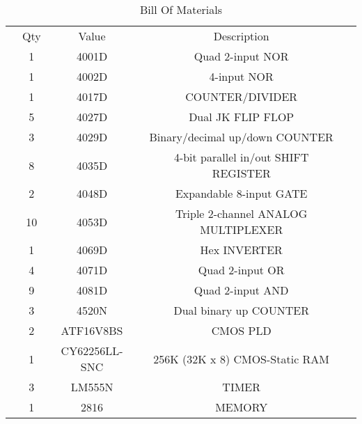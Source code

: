 \documentclass[letterpaper,titlepage,oneside]{article}
\begin{document}
\begin{table}[h!]
\begin{center}
\caption{Bill Of Materials}\label{BOM}
\begin{tabular}{c|c|c|c|c}
\cline{2-4}
&	Qty	&	Value	&	Description	&	\\
\cline{2-4}
& 1 & 4001D & Quad 2-input NOR  & \\
& 1 & 4002D & 4-input NOR & \\
& 1 & 4017D & COUNTER/DIVIDER & \\
& 5 & 4027D & Dual JK FLIP FLOP & \\
& 3 & 4029D & Binary/decimal up/down COUNTER  & \\
& 8 & 4035D & 4-bit parallel in/out SHIFT REGISTER  & \\
& 2 & 4048D & Expandable 8-input GATE & \\
& 10  & 4053D & Triple 2-channel ANALOG MULTIPLEXER & \\
& 1 & 4069D & Hex INVERTER  & \\
& 4 & 4071D & Quad 2-input OR & \\
& 9 & 4081D & Quad 2-input AND  & \\
& 3 & 4520N & Dual binary up COUNTER  & \\
& 2 & ATF16V8BS & CMOS PLD  & \\
& 1 & CY62256LL-SNC & 256K (32K x 8) CMOS-Static RAM  & \\
& 3 & LM555N  & TIMER & \\
& 1 & 2816  & MEMORY  & \\
\cline{2-4}

\end{tabular}
\end{center}
\end{table}
\end{document}
